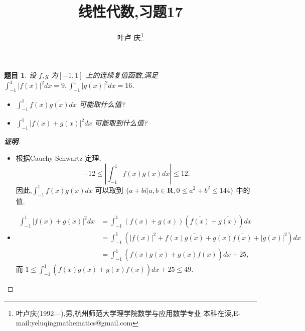 \documentclass[a4paper]{article}
\newtheorem*{exe}{题目}
\newenvironment{exercise}
{\bigskip\begin{mdframed}\begin{exe}}
    {\end{exe}\end{mdframed}\bigskip}
\begin{document}
\title{\huge{\bf{线性代数,习题17}}} \author{\small{叶卢
    庆\footnote{叶卢庆(1992---),男,杭州师范大学理学院数学与应用数学专业
      本科在读,E-mail:yeluqingmathematics@gmail.com}}}
\maketitle
\begin{exercise}
  设 $f,g$ 为$[-1,1]$ 上的连续复值函数,满足 $\int_{-1}^1|f(x)|^2dx=9,\int_{-1}^1|g(x)|^2dx=16$.
  \begin{itemize}
  \item $\int_{-1}^1f(x)\overline{g(x)}dx$ 可能取什么值?
\item $\int_{-1}^1|f(x)+g(x)|^2dx$ 可能取到什么值?
  \end{itemize}
\end{exercise}
\begin{proof}[\textbf{证明}]
  \begin{itemize}
  \item 根据Cauchy-Schwartz 定理,
$$-12\leq|\int_{-1}^1f(x)\overline{g(x)}dx|\leq 12.$$
因此,$\int_{-1}^1f(x)\overline{g(x)}dx$ 可以取到 $\{a+bi|a,b\in
\mathbf{R},0\leq a^2+b^2\leq 144\}$ 中的值.
\item 
  \begin{align*}
    \int_{-1}^1|f(x)+g(x)|^2dx&=\int_{-1}^1(f(x)+g(x))(\overline{f(x)}+\overline{g(x)})dx\\&=\int_{-1}^1(|f(x)|^2+f(x)\overline{g(x)}+g(x)\overline{f(x)}+|g(x)|^2)dx\\&=\int_{-1}^1(f(x)\overline{g(x)}+g(x)\overline{f(x)})dx+25,
  \end{align*}
而 $1\leq\int_{-1}^1(f(x)\overline{g(x)}+g(x)\overline{f(x)})dx+25\leq 49$.
  \end{itemize}
\end{proof}
\end{document}
